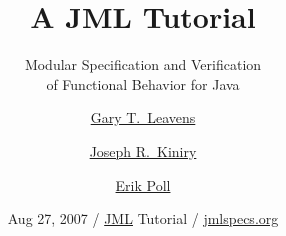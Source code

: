 \newcommand{\join}{\ensuremath{\sqcup}}
\newcommand{\bigjoin}{\ensuremath{\bigsqcup}}
\newcommand{\refines}{\ensuremath{\sqsupseteq}}
\newcommand{\supers}{\textit{supers}}
\newcommand{\methods}{\textit{methods}}

\newcommand{\true}{\mbox{\textit{true}}}
\newcommand{\false}{\mbox{\textit{false}}}

\newcommand{\oa}{\texttt{\textbackslash{\textbf{only\_assigned}}}}
\newcommand{\At}{\triangleright}
\newcommand{\Spec}[1]{\textrm{Spec}(#1)}
\newcommand{\Proves}{\:\: \vdash \:\:}

\title[JML Tutorial]{A JML Tutorial}
\subtitle{Modular Specification and Verification \\
of Functional Behavior for Java}

\author[Gary T. Leavens] %
{\href{https://www.eecs.ucf.edu/~leavens/}{Gary T.~Leavens}
  \and \href{https://secure.ucd.ie/~kiniry/}{Joseph R.~Kiniry}
  \and \href{https://www.cs.ru.nl/~erikpoll/}{Erik Poll}}

\date[Fall 2007]{Aug 27, 2007 / \href{https://www.jmlspecs.org/}{JML} Tutorial / \href{http://www.jmlspecs.org}{jmlspecs.org}}

\subject{JML} %





\begin{frame}
  \titlepage
\end{frame}

